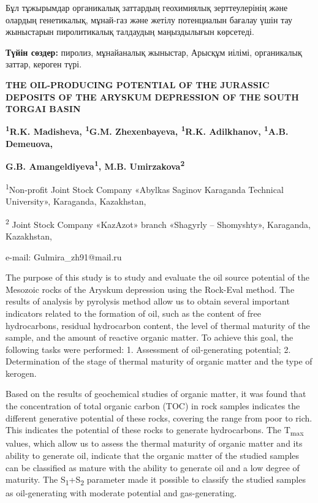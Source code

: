 Бұл тұжырымдар органикалық заттардың геохимиялық зерттеулерінің және
олардың генетикалық, мұнай-газ және жетілу потенциалын бағалау үшін тау
жыныстарын пиролитикалық талдаудың маңыздылығын көрсетеді.

{\bfseries Түйін сөздер:} пиролиз, мұнайаналық жыныстар, Арысқұм иілімі,
органикалық заттар, кероген түрі.

\begin{center}
{\large\bfseries THE OIL-PRODUCING POTENTIAL OF THE JURASSIC DEPOSITS OF THE
ARYSKUM DEPRESSION OF THE SOUTH TORGAI BASIN}

{\bfseries \textsuperscript{1}R.K. Madisheva, \textsuperscript{1}G.M.
Zhexenbayeva\envelope, \textsuperscript{1}R.K. Adilkhanov,
\textsuperscript{1}A.B. Demeuova,}

{\bfseries G.B. Amangeldiyeva\textsuperscript{1}, M.B.
Umirzakova\textsuperscript{2}}

\textsuperscript{1}Non-profit Joint Stock Company «Abylkas Saginov
Karaganda Technical University», Karaganda, Kazakhstan,

\textsuperscript{2} Joint Stock Company «KazAzot» branch «Shagyrly --
Shomyshty», Karaganda, Kazakhstan,

e-mail: Gulmira\_zh91@mail.ru
\end{center}

The purpose of this study is to study and evaluate the oil source
potential of the Mesozoic rocks of the Aryskum depression using the
Rock-Eval method. The results of analysis by pyrolysis method allow us
to obtain several important indicators related to the formation of oil,
such as the content of free hydrocarbons, residual hydrocarbon content,
the level of thermal maturity of the sample, and the amount of reactive
organic matter. To achieve this goal, the following tasks were
performed: 1. Assessment of oil-generating potential; 2. Determination
of the stage of thermal maturity of organic matter and the type of
kerogen.

Based on the results of geochemical studies of organic matter, it was
found that the concentration of total organic carbon (TOC) in rock
samples indicates the different generative potential of these rocks,
covering the range from poor to rich. This indicates the potential of
these rocks to generate hydrocarbons. The T\textsubscript{max} values,
which allow us to assess the thermal maturity of organic matter and its
ability to generate oil, indicate that the organic matter of the studied
samples can be classified as mature with the ability to generate oil and
a low degree of maturity. The S\textsubscript{1}+S\textsubscript{2}
parameter made it possible to classify the studied samples as
oil-generating with moderate potential and gas-generating.

